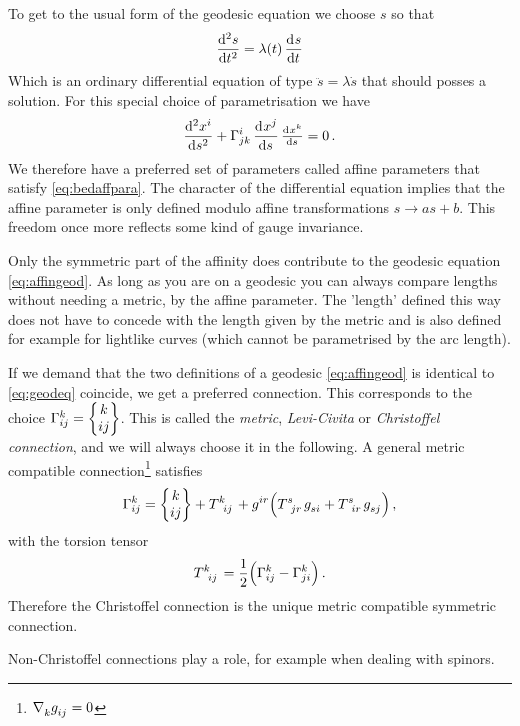 To get to the usual form of the geodesic equation we choose $s$ so that
\begin{equation}
\dod[2]{s}{t}=\lambda(t)\dod{s}{t}\label{eq:bedaffpara}
\end{equation}
Which is an ordinary differential equation of type $\ddot{s}=\lambda\dot{s}$
that should posses a solution. 
For this special choice of parametrisation we have
\begin{equation}
\dod[2]{\tensor{x}{^i}}{s}+\affin{i}{j}{k}\dod{\tensor{x}{^j}}{s}\od{\tensor{x}{^k}}{s}
=0\,.\label{eq:affingeod}
\end{equation}
We therefore have a preferred set of parameters
called affine parameters that satisfy \eqref{eq:bedaffpara}. The character
of the differential equation implies that the affine parameter is only
defined modulo affine transformations $s\to as+b$. This freedom once more
reflects some kind of gauge invariance.
\begin{remark}
Only the symmetric part of the affinity does contribute to
the geodesic equation \eqref{eq:affingeod}. As long as you are on a geodesic you
can always compare lengths without needing a metric, by the affine parameter.
The 'length' defined this way does not have to concede with the length given by
the metric and is also defined for example for lightlike curves (which cannot
be parametrised by the arc length).
\end{remark}
If we demand that the two definitions of a geodesic \eqref{eq:affingeod} is
identical to \eqref{eq:geodeq} coincide, we get a preferred
connection.
This corresponds to the choice $\Gamma^{k}_{i j}=\begin{Bmatrix} k \\ i j \end{Bmatrix}$.
This is called the \emph{metric}, \emph{Levi-Civita} or \emph{Christoffel
connection}, and we will always choose it in the following.
A general metric compatible
connection\footnote{$\tensor{\nabla}{_k}\tensor{g}{_i_j}=0$} satisfies
\begin{equation}
\affin{k}{i}{j}=\cSym{k}{i}{j}+\tensor{T}{^k_i_j}
+\tensor{g}{^i^r}\left(\tensor{T}{^s_j_r}\tensor{g}{_s_i}+\tensor{T}{^s_i_r}\tensor{g}{_s_j}\right)\,,
\end{equation}
with the torsion tensor
\begin{equation}
\tensor{T}{^k_i_j}=\frac{1}{2}\left(\affin{k}{i}{j}-\affin{k}{j}{i}\right)\,.
\end{equation}
Therefore the Christoffel connection is the unique metric compatible
symmetric connection.
\begin{remark}
Non-Christoffel connections play a role, for example when dealing with spinors.
\end{remark}
